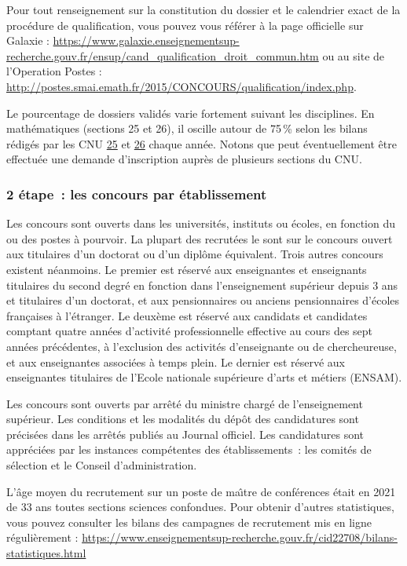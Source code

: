 Pour tout renseignement sur la constitution du dossier et le calendrier exact de la proc\'edure de qualification, 
vous pouvez vous r\'ef\'erer \`a la page officielle sur Galaxie : \url{https://www.galaxie.enseignementsup-recherche.gouv.fr/ensup/cand_qualification_droit_commun.htm} ou au site de l'Operation Postes : \url{http://postes.smai.emath.fr/2015/CONCOURS/qualification/index.php}.

Le pourcentage de dossiers valid\'es
varie fortement suivant les disciplines. En math\'ematiques
(sections 25 et 26), il oscille autour de 75\,\% selon les bilans r\'edig\'es par les CNU 
\href{http://cnu25.emath.fr/}{25} et \href{http://cnu26.emath.fr/}{26} chaque ann\'ee. Notons que peut
\'eventuellement \^etre effectu\'ee
une demande d'inscription aupr\`es de plusieurs sections du CNU.

\subsubsection*{2\ieme{} \'etape~: les concours par \'etablissement}

Les concours sont ouverts dans les universit\'es, instituts ou
\'ecoles, en fonction du ou des postes \`a pourvoir. La plupart des
recrut\'e\mp e\mp s le sont sur le concours ouvert aux titulaires d'un
doctorat ou d'un dipl\^ome \'equivalent. Trois autres concours
existent n\'eanmoins. Le premier est r\'eserv\'e aux enseignantes et enseignants
titulaires du second degr\'e en fonction dans l'enseignement
sup\'erieur depuis 3 ans et titulaires d'un doctorat, et aux
pensionnaires ou anciens pensionnaires d'\'ecoles fran\c{c}aises \`a
l'\'etranger. Le deux\`eme est r\'eserv\'e aux candidats et candidates comptant
quatre ann\'ees d'activit\'e professionnelle effective au cours des
sept ann\'ees pr\'ec\'edentes, \`a l'exclusion des activit\'es
d'enseignant\mp e ou de chercheur\mp euse, et aux enseignant\mp e\mp s associ\'e\mp e\mp s \`a
temps plein.
Le dernier est r\'eserv\'e aux enseignant\mp e\mp s titulaires de l'Ecole nationale sup\'erieure d'arts et m\'etiers (ENSAM).

Les concours sont ouverts par arr\^et\'e du ministre charg\'e de
l'enseignement sup\'erieur. Les conditions et les modalit\'es du
d\'ep\^ot des candidatures sont pr\'ecis\'ees dans les arr\^et\'es
publi\'es au Journal officiel. Les candidatures sont
appr\'eci\'ees par les instances comp\'etentes des
\'etablissements~:
les comit\'es de s\'election et le Conseil d'administration.

L'\^age moyen du recrutement sur un poste de ma\^\i  tre de
conf\'erences \'etait en 2021 de 33 ans toutes sections sciences confondues. Pour obtenir d'autres statistiques, vous pouvez consulter les bilans des campagnes de recrutement mis en ligne r\'e\-gu\-li\`erement :
{\url{https://www.enseignementsup-recherche.gouv.fr/cid22708/bilans-statistiques.html}}

